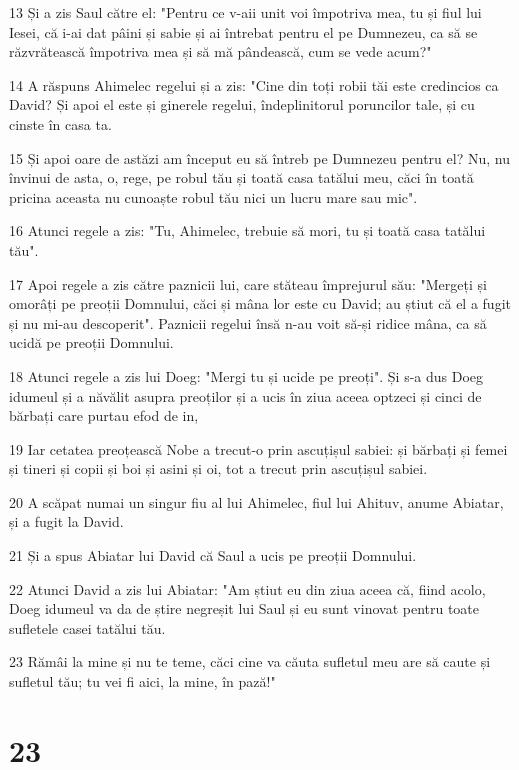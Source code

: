 \par 13 Și a zis Saul către el: "Pentru ce v-aii unit voi împotriva mea, tu și fiul lui Iesei, că i-ai dat pâini și sabie și ai întrebat pentru el pe Dumnezeu, ca să se răzvrătească împotriva mea și să mă pândească, cum se vede acum?"
\par 14 A răspuns Ahimelec regelui și a zis: "Cine din toți robii tăi este credincios ca David? Și apoi el este și ginerele regelui, îndeplinitorul poruncilor tale, și cu cinste în casa ta.
\par 15 Și apoi oare de astăzi am început eu să întreb pe Dumnezeu pentru el? Nu, nu învinui de asta, o, rege, pe robul tău și toată casa tatălui meu, căci în toată pricina aceasta nu cunoaște robul tău nici un lucru mare sau mic".
\par 16 Atunci regele a zis: "Tu, Ahimelec, trebuie să mori, tu și toată casa tatălui tău".
\par 17 Apoi regele a zis către paznicii lui, care stăteau împrejurul său: "Mergeți și omorâți pe preoții Domnului, căci și mâna lor este cu David; au știut că el a fugit și nu mi-au descoperit". Paznicii regelui însă n-au voit să-și ridice mâna, ca să ucidă pe preoții Domnului.
\par 18 Atunci regele a zis lui Doeg: "Mergi tu și ucide pe preoți". Și s-a dus Doeg idumeul și a năvălit asupra preoților și a ucis în ziua aceea optzeci și cinci de bărbați care purtau efod de in,
\par 19 Iar cetatea preoțească Nobe a trecut-o prin ascuțișul sabiei: și bărbați și femei și tineri și copii și boi și asini și oi, tot a trecut prin ascuțișul sabiei.
\par 20 A scăpat numai un singur fiu al lui Ahimelec, fiul lui Ahituv, anume Abiatar, și a fugit la David.
\par 21 Și a spus Abiatar lui David că Saul a ucis pe preoții Domnului.
\par 22 Atunci David a zis lui Abiatar: "Am știut eu din ziua aceea că, fiind acolo, Doeg idumeul va da de știre negreșit lui Saul și eu sunt vinovat pentru toate sufletele casei tatălui tău.
\par 23 Rămâi la mine și nu te teme, căci cine va căuta sufletul meu are să caute și sufletul tău; tu vei fi aici, la mine, în pază!"

\chapter{23}


